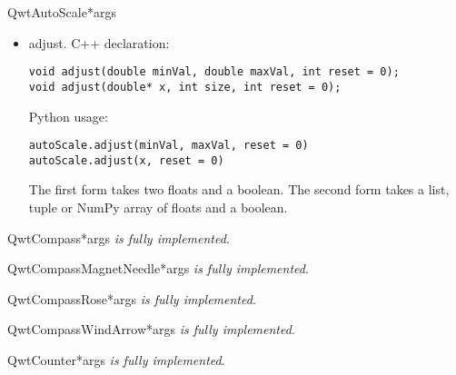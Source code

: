 \documentclass{manual}
\begin{document}
\begin{classdesc}{QwtAutoScale}{*args}

  \begin{itemize}
  
    \item{adjust}. C++ declaration:
      \begin{verbatim}
void adjust(double minVal, double maxVal, int reset = 0);
void adjust(double* x, int size, int reset = 0);
      \end{verbatim}
      Python usage:
      \begin{verbatim}
autoScale.adjust(minVal, maxVal, reset = 0)
autoScale.adjust(x, reset = 0)
    \end{verbatim}
      The first form takes two floats and a boolean.
      The second form takes a list, tuple or NumPy array of floats and a
      boolean.

  \end{itemize}
\end{classdesc}

\begin{classdesc}{QwtCompass}{*args}
\emph{is fully implemented}.
\end{classdesc}

\begin{classdesc}{QwtCompassMagnetNeedle}{*args}
\emph{is fully implemented}.
\end{classdesc}

\begin{classdesc}{QwtCompassRose}{*args}
\emph{is fully implemented}.
\end{classdesc}

\begin{classdesc}{QwtCompassWindArrow}{*args}
\emph{is fully implemented}.
\end{classdesc}

\begin{classdesc}{QwtCounter}{*args}
\emph{is fully implemented}.
\end{classdesc}
\end{document}
